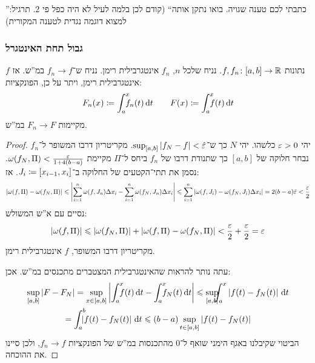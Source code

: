 \documentclass[name=רשימות חדו''א 2א]{../../../tex/classes/noChapterMegasumPreamble}
\begin{document}
	''כתבתי לכם טענה שגויה. בואו נתקן אותה`` (קודם לכן בלמה לעיל לא היה כפל פי $2$. תרגיל: למצוא דוגמה נגדית לטענה המקורית)

\subsubsection{גבול תחת האינטגרל}
	\begin{Theorem}
		נתונות $f, f_n \colon [a, b] \to \mathbb{R}$. נניח שלכל $n$, $f_n$ אינטגרבילית רימן. נניח ש־$f_n \to f$ במ''ש. אז $f$ אינטגרבילית רימן, ויתר על כן, הפונקציות:
		\[ F_n(x) \cod \int^{x}_a \dequad \ f_n(t)\dt \quad \quad F(x) \cod \int^{x}_a \dequad \ f(t)\dt \]
		מקיימות $F_n \to F$ במ''ש.
	\end{Theorem}
	\begin{proof}
		יהי $\eg > 0$ כלשהו. יהי $N$ כך ש־$\sup_{[a, b]}\sof{f_N - f} < \hat \eg$. מקריטריון דרבו המשופר ל־$f_n$ נבחר חלוקה של $[a, b]$ כך שתנודת דרבו של $f_n$ ביחס ל־$\Pi$ מקיימת $\wg(f_N, \Pi) < \frac{\eg}{1 + 4(b - a)}$. נסמן את תתי־הקטעים של החלוקה ב־$J_i \coloneqq [x_{i - 1}, x_i]$. אז:
		\[ \sof{\wg(f, \Pi) - \wg(f_N, \Pi)} \le \sof{\sum_{i = 1}^{n}\wg(f, J_n) \Delta x_i - \sum_{i =1}^{n}\wg(f_N, J_n)\Delta x_i} \le \sum_{i = 1}^{n}\sof{\wg(f, J_i) - \wg(f_N, J_i)\Delta x_i} = 2(b - a)\hat \eg < \frac{\eg}{2} \]
		נסיים עם א''ש המשולש:
		\[ \sof{\wg(f, \Pi)} \le \sof{\wg(f_N, \Pi)} + \sof{\wg(f, \Pi) - \wg(f_N, \Pi)} < \frac{\eg}{2} + \frac{\eg}{2} = \eg \]
		מקריטריון דרבו המשופר, $f$ אינטגרבילית רימן.

		עתה נותר להראות שהאינטגרבילית המצטברים מתכנסים במ''ש. אכן:
		\begin{multline*}
			\sup_{[a, b]} \sof{F - F_N} = \sup_{x \in [a, b]}\sof{\int^{x}_a \dequad \ f(t)\dt - \int^{x}_a \dequad \ f_N(t) \dt} \le \sup_{[a, b]}\dequad \ \int^{x}_a \sof{f(t) - f_N(t)} \dt \\
			= \int^{b}_a \dequad \ \sof{f(t) - f_N(t)}\dt \le (b - a) \sup_{t \in [a, b]} \sof{f(t) - f_N(t)}
		\end{multline*}
		הביטוי שקיבלנו באגף הימני שואף ל־$0$ מהתכנסות במ''ש של הפונקציות $f_n \to f$, ולכן סיינו את ההוכחה.
	\end{proof}
\end{document}

